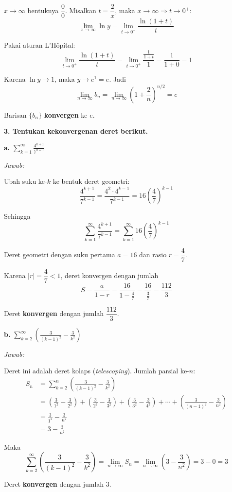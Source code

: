 \documentclass[12pt,a4paper]{article}
\begin{document}
$x\to\infty$ bentuknya $\dfrac{0}{0}$. Misalkan $t = \dfrac{2}{x}$, maka $x\to\infty \Rightarrow t\to 0^{+}$:
\[
\lim_{x\to\infty} \ln y = \lim_{t\to 0^{+}} \frac{\ln(1+t)}{t}
\]

Pakai aturan L'H\^opital:
\[
\lim_{t\to 0^{+}} \frac{\ln(1+t)}{t} = \lim_{t\to 0^{+}} \frac{\frac{1}{1+t}}{1} = \frac{1}{1+0} = 1
\]

Karena $\ln y \to 1$, maka $y \to e^{1} = e$. Jadi
\[
\lim_{n\to\infty} b_n = \lim_{n\to\infty}\left(1+\frac{2}{n}\right)^{n/2} = e
\]

Barisan $\{b_n\}$ \textbf{konvergen} ke $e$.

\vspace{6mm}
\textbf{3. Tentukan kekonvergenan deret berikut.}

\textbf{a.} $\displaystyle \sum_{k=1}^{\infty} \frac{4^{k+1}}{7^{k-1}}$

\textit{Jawab:}

Ubah suku ke-$k$ ke bentuk deret geometri:
\[
\frac{4^{k+1}}{7^{k-1}} = \frac{4^{2}\cdot 4^{k-1}}{7^{k-1}} = 16\left(\frac{4}{7}\right)^{k-1}
\]

Sehingga
\[
\sum_{k=1}^{\infty} \frac{4^{k+1}}{7^{k-1}} = \sum_{k=1}^{\infty} 16\left(\frac{4}{7}\right)^{k-1}
\]

Deret geometri dengan suku pertama $a = 16$ dan rasio $r = \dfrac{4}{7}$.

Karena $|r| = \dfrac{4}{7} < 1$, deret konvergen dengan jumlah
\[
S = \frac{a}{1-r} = \frac{16}{1-\frac{4}{7}} = \frac{16}{\frac{3}{7}} = \frac{112}{3}
\]

Deret \textbf{konvergen} dengan jumlah $\dfrac{112}{3}$.

\vspace{4mm}
\textbf{b.} $\displaystyle \sum_{k=2}^{\infty} \left(\frac{3}{(k-1)^2} - \frac{3}{k^2}\right)$

\textit{Jawab:}

Deret ini adalah deret kolaps (\textit{telescoping}). Jumlah parsial ke-$n$:
\begin{align*}
S_n &= \sum_{k=2}^{n} \left(\frac{3}{(k-1)^2} - \frac{3}{k^2}\right) \\
&= \left(\frac{3}{1^2} - \frac{3}{2^2}\right) + \left(\frac{3}{2^2} - \frac{3}{3^2}\right) + \left(\frac{3}{3^2} - \frac{3}{4^2}\right) + \cdots + \left(\frac{3}{(n-1)^2} - \frac{3}{n^2}\right) \\
&= \frac{3}{1^2} - \frac{3}{n^2} \\
&= 3 - \frac{3}{n^2}
\end{align*}

Maka
\[
\sum_{k=2}^{\infty} \left(\frac{3}{(k-1)^2} - \frac{3}{k^2}\right) = \lim_{n\to\infty} S_n = \lim_{n\to\infty}\left(3 - \frac{3}{n^2}\right) = 3 - 0 = 3
\]

Deret \textbf{konvergen} dengan jumlah 3.
\end{document}
